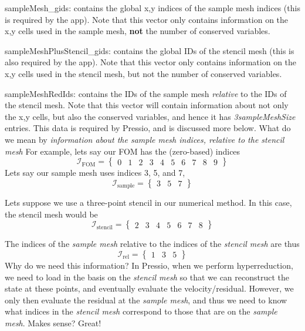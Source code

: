\begin{DoxyEnumerate}
\item {\ttfamily sample\+Mesh\+\_\+gids}\+: contains the global x,y indices of the sample mesh indices (this is required by the app). Note that this vector only contains information on the x,y cells used in the sample mesh, {\bfseries{not}} the number of conserved variables.
\item {\ttfamily sample\+Mesh\+Plus\+Stencil\+\_\+gids}\+: contains the global IDs of the stencil mesh (this is also required by the app). Note that this vector only contains information on the x,y cells used in the stencil mesh, but not the number of conserved variables.
\item {\ttfamily sample\+Mesh\+Red\+Ids}\+: contains the IDs of the sample mesh {\itshape relative} to the IDs of the stencil mesh. Note that this vector will contain information about not only the x,y cells, but also the conserved variables, and hence it has {\itshape 3sample\+Mesh\+Size} entries. This data is required by Pressio, and is discussed more below. What do we mean by {\itshape information about the sample mesh indices, relative to the stencil mesh} For example, let\textquotesingle{}s say our FOM has the (zero-\/based) indices \[ \mathcal{I}_{\text{FOM}} = \begin{Bmatrix} 0& 1 & 2 & 3 & 4 & 5 & 6 & 7 & 8 & 9 \end{Bmatrix}\] Let\textquotesingle{}s say our sample mesh uses indices 3, 5, and 7, \[ \mathcal{I}_{\text{sample}} = \begin{Bmatrix} 3 & 5 & 7 \end{Bmatrix}\]
\end{DoxyEnumerate}

Let\textquotesingle{}s suppose we use a three-\/point stencil in our numerical method. In this case, the stencil mesh would be \[ \mathcal{I}_{\text{stencil}} = \begin{Bmatrix} 2& 3 & 4& 5 &6 & 7 & 8\end{Bmatrix}\]

The indices of the {\itshape sample mesh} relative to the indices of the {\itshape stencil mesh} are thus \[ \mathcal{I}_{\text{rel}} =\begin{Bmatrix} 1 & 3 & 5 \end{Bmatrix}\] Why do we need this information? In Pressio, when we perform hyperreduction, we need to load in the basis on the {\itshape stencil mesh} so that we can reconstruct the state at these points, and eventually evaluate the velocity/residual. However, we only then evaluate the residual at the {\itshape sample mesh}, and thus we need to know what indices in the {\itshape stencil mesh} correspond to those that are on the {\itshape sample mesh}. Makes sense? Great!

